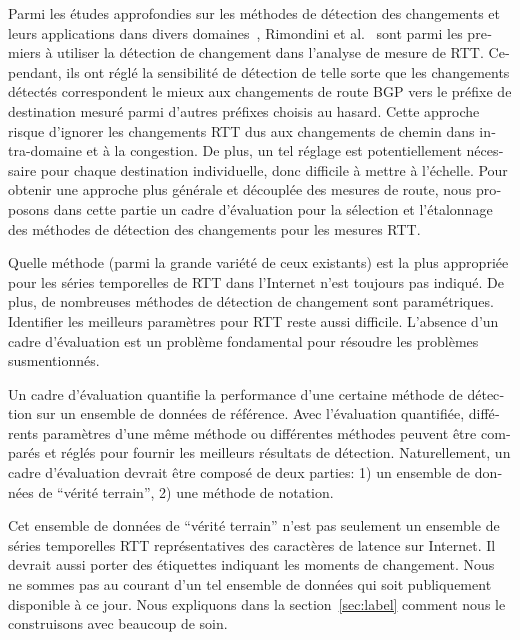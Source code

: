 \begin{otherlanguage}{french}
Parmi les études approfondies sur les méthodes de détection des changements et leurs applications dans divers domaines~\cite{Zhang2007, Reeves2007, Yu2008},
Rimondini et al.~\cite{Rimondini2014} sont parmi les premiers à utiliser la détection de changement dans l'analyse de mesure de RTT.
Cependant, ils ont réglé la sensibilité de détection de telle sorte que les changements détectés correspondent le mieux aux changements de route BGP vers le préfixe de destination mesuré parmi d'autres préfixes choisis au hasard.
Cette approche risque d'ignorer les changements RTT dus aux changements de chemin dans intra-domaine et à la congestion.
De plus, un tel réglage est potentiellement nécessaire pour chaque destination individuelle, donc difficile à mettre à l'échelle.
Pour obtenir une approche plus générale et découplée des mesures de route, 
nous proposons dans cette partie un cadre d'évaluation pour la sélection et l'étalonnage des méthodes de détection des changements pour les mesures RTT.

Quelle méthode (parmi la grande variété de ceux existants) est la plus appropriée pour les séries temporelles de RTT dans l'Internet n'est toujours pas indiqué.
De plus, de nombreuses méthodes de détection de changement sont paramétriques.
Identifier les meilleurs paramètres pour RTT reste aussi difficile.
L'absence d'un cadre d'évaluation est un problème fondamental pour résoudre les problèmes susmentionnés.

Un cadre d'évaluation quantifie la performance d'une certaine méthode de détection sur un ensemble de données de référence.
Avec l'évaluation quantifiée, différents paramètres d'une même méthode ou différentes méthodes peuvent être comparés et réglés pour fournir les meilleurs résultats de détection.
Naturellement, un cadre d'évaluation devrait être composé de deux parties: 
1) un ensemble de données de ``vérité terrain'', 2) une méthode de notation.

Cet ensemble de données de ``vérité terrain'' n'est pas seulement un ensemble de séries temporelles RTT représentatives des caractères de latence sur Internet.
Il devrait aussi porter des étiquettes indiquant les moments de changement.
Nous ne sommes pas au courant d'un tel ensemble de données qui soit publiquement disponible à ce jour.
Nous expliquons dans la section~\ref{sec:label} comment nous le construisons avec beaucoup de soin.


\end{otherlanguage}
